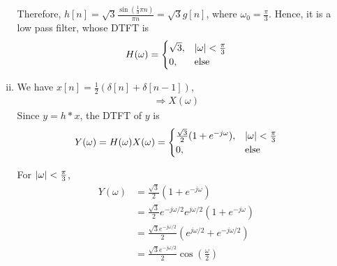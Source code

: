 \begin{enumerate}[(a)]
\begin{enumerate}[i.]
	Therefore, $h[n] = \sqrt{3} \frac{\sin \left( \frac{1}{3} \pi n \right) }{\pi n} = \sqrt{3} g[n]$, where $\omega_0 = \frac{\pi}{3}$. Hence, it is a low pass filter, whose DTFT is
	\[H(\omega) = \begin{cases}
	\sqrt{3}, & \left\lvert \omega \right\rvert < \frac{\pi}{3} \\
	0, & \text{else}
	\end{cases}\]
	
	\item We have $x[n] = \frac{1}{2} (\delta[n] + \delta[n-1])$,
	\begin{align*}
		\Rightarrow X(\omega) 
	\end{align*}
	Since $y = h * x$, the DTFT of $y$ is
	\[ Y(\omega) = H(\omega) X(\omega) = \begin{cases}
	\frac{\sqrt{3}}{2}(1 + e^{-j \omega}), & \left\lvert \omega \right\rvert < \frac{\pi}{3} \\
	0, & \text{else}
	\end{cases}\]
	
	For $\left\lvert \omega \right\rvert < \frac{\pi}{3}$,
	\begin{align*}
	Y(\omega) 
	&= \frac{\sqrt{3}}{2}(1 + e^{-j \omega}) \\
	&= \frac{\sqrt{3}}{2}e^{-j\omega / 2} e^{j\omega / 2}(1 + e^{-j\omega}) \\
	&= \frac{\sqrt{3}e^{-j\omega / 2}}{2} (e^{j\omega / 2} + e^{-j\omega/2}) \\
	&= \frac{\sqrt{3}e^{-j\omega / 2}}{2} \cos\left(\frac{\omega}{2}\right)
	\end{align*}
\end{enumerate}

\end{enumerate}